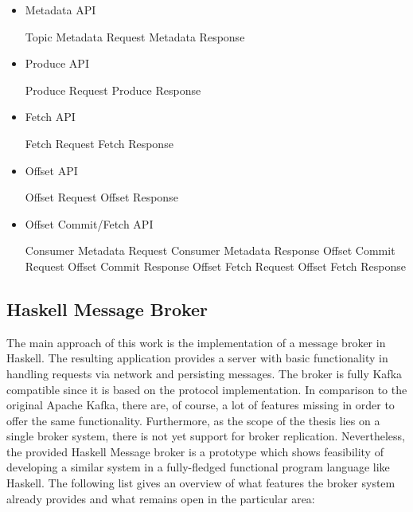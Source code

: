 \begin{itemize}
    \item Metadata API
    \begin{itemize}
        \tick Topic Metadata Request
        \tick Metadata Response
    \end{itemize}
    \item Produce API
    \begin{itemize}
        \tick Produce Request
        \tick Produce Response
    \end{itemize}
    \item Fetch API
    \begin{itemize}
        \tick Fetch Request
        \tick Fetch Response
    \end{itemize}
    \item Offset API
    \begin{itemize}
        \fail Offset Request
        \fail Offset Response
    \end{itemize}
    \item Offset Commit/Fetch API
    \begin{itemize}
        \fail Consumer Metadata Request
        \fail Consumer Metadata Response
        \fail Offset Commit Request
        \fail Offset Commit Response
        \fail Offset Fetch Request
        \fail Offset Fetch Response
    \end{itemize}
\end{itemize}

\subsection{Haskell Message Broker}

The main approach of this work is the implementation of a message broker in
Haskell. The resulting application provides a server with basic functionality in
handling requests via network and persisting messages. The broker is fully Kafka
compatible since it is based on the protocol implementation.  In comparison to the
original Apache Kafka, there are, of course, a lot of features missing in order to offer the
same functionality. Furthermore, as the scope of the thesis lies on a single
broker system, there is not yet support for broker replication. Nevertheless, the
provided Haskell Message broker is a prototype which shows feasibility of
developing a similar system in a fully-fledged functional program language like
Haskell. The following list gives an overview of what features the broker system
already provides and what remains open in the particular area:

